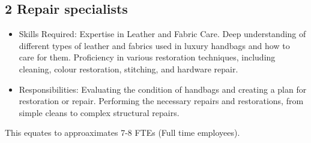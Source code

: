 \documentclass{tufte-handout}
\begin{document}
\subsection{2 Repair specialists}\label{sec:page-layout}
\begin{itemize}
    \item Skills Required: Expertise in Leather and Fabric Care. Deep understanding of different types of leather and fabrics used in luxury handbags and how to
    care for them. Proficiency in various restoration techniques, including cleaning, colour restoration, stitching, and hardware repair.
    \item Responsibilities: Evaluating the condition of handbags and creating a plan for restoration or repair. Performing the necessary repairs and restorations,
    from simple cleans to complex structural repairs.
\end{itemize}

This equates to approaximates 7-8 FTEs (Full time employees).


\end{document}
